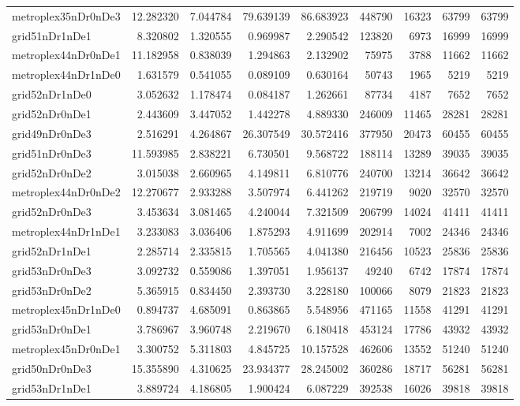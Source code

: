 \begin{longtable}{|l|r|r|r|r|r|r|r|r|}
metroplex35nDr0nDe3 & 12.282320 & 7.044784 & 79.639139 & 86.683923 & 448790 & 16323 & 63799 & 63799 \\
grid51nDr1nDe1 & 8.320802 & 1.320555 & 0.969987 & 2.290542 & 123820 & 6973 & 16999 & 16999 \\
metroplex44nDr0nDe1 & 11.182958 & 0.838039 & 1.294863 & 2.132902 & 75975 & 3788 & 11662 & 11662 \\
metroplex44nDr1nDe0 & 1.631579 & 0.541055 & 0.089109 & 0.630164 & 50743 & 1965 & 5219 & 5219 \\
grid52nDr1nDe0 & 3.052632 & 1.178474 & 0.084187 & 1.262661 & 87734 & 4187 & 7652 & 7652 \\
grid52nDr0nDe1 & 2.443609 & 3.447052 & 1.442278 & 4.889330 & 246009 & 11465 & 28281 & 28281 \\
grid49nDr0nDe3 & 2.516291 & 4.264867 & 26.307549 & 30.572416 & 377950 & 20473 & 60455 & 60455 \\
grid51nDr0nDe3 & 11.593985 & 2.838221 & 6.730501 & 9.568722 & 188114 & 13289 & 39035 & 39035 \\
grid52nDr0nDe2 & 3.015038 & 2.660965 & 4.149811 & 6.810776 & 240700 & 13214 & 36642 & 36642 \\
metroplex44nDr0nDe2 & 12.270677 & 2.933288 & 3.507974 & 6.441262 & 219719 & 9020 & 32570 & 32570 \\
grid52nDr0nDe3 & 3.453634 & 3.081465 & 4.240044 & 7.321509 & 206799 & 14024 & 41411 & 41411 \\
metroplex44nDr1nDe1 & 3.233083 & 3.036406 & 1.875293 & 4.911699 & 202914 & 7002 & 24346 & 24346 \\
grid52nDr1nDe1 & 2.285714 & 2.335815 & 1.705565 & 4.041380 & 216456 & 10523 & 25836 & 25836 \\
grid53nDr0nDe3 & 3.092732 & 0.559086 & 1.397051 & 1.956137 & 49240 & 6742 & 17874 & 17874 \\
grid53nDr0nDe2 & 5.365915 & 0.834450 & 2.393730 & 3.228180 & 100066 & 8079 & 21823 & 21823 \\
metroplex45nDr1nDe0 & 0.894737 & 4.685091 & 0.863865 & 5.548956 & 471165 & 11558 & 41291 & 41291 \\
grid53nDr0nDe1 & 3.786967 & 3.960748 & 2.219670 & 6.180418 & 453124 & 17786 & 43932 & 43932 \\
metroplex45nDr0nDe1 & 3.300752 & 5.311803 & 4.845725 & 10.157528 & 462606 & 13552 & 51240 & 51240 \\
grid50nDr0nDe3 & 15.355890 & 4.310625 & 23.934377 & 28.245002 & 360286 & 18717 & 56281 & 56281 \\
grid53nDr1nDe1 & 3.889724 & 4.186805 & 1.900424 & 6.087229 & 392538 & 16026 & 39818 & 39818 \\

\end{longtable}
